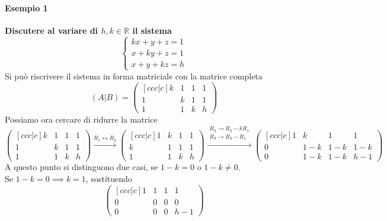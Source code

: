 \paragraph{Esempio 1}%
\textbf{Discutere al variare di $h,k\in\mathbb{R}$ il sistema}
\begin{equation*}
  \begin{cases}
    kx + y + z = 1\\
    x + ky + z = 1\\
    x + y + kz = h
  \end{cases}
\end{equation*}
Si può riscrivere il sistema in forma matriciale con la matrice completa
\begin{equation*}
  (A\vert B) =
  \begin{pmatrix}[ccc|c]
    k & 1 & 1 & 1\\
    1 & k & 1 & 1\\
    1 & 1 & k & h
  \end{pmatrix}
\end{equation*}
Possiamo ora cercare di ridurre la matrice
\begin{equation*}
  \begin{pmatrix}[ccc|c]
    k & 1 & 1 & 1\\
    1 & k & 1 & 1\\
    1 & 1 & k & h
  \end{pmatrix}
  \xrightarrow{R_1\leftrightarrow R_2}
  \begin{pmatrix}[ccc|c]
    1 & k & 1 & 1\\
    k & 1 & 1 & 1\\
    1 & 1 & k & h
  \end{pmatrix}
  \xrightarrow{\substack{R_2\to R_2-kR_1\\ R_3\to R_3-R_1}}
  \begin{pmatrix}[ccc|c]
    1 & k & 1 & 1\\
    0 & 1-k & 1-k & 1-k\\
    0 & 1-k & 1-k & h-1
  \end{pmatrix}
\end{equation*}
A questo punto si distinguono due casi, se $1-k = 0$ o $1-k\neq0$.\\
Se $1-k=0\implies k=1$, sostituendo
\begin{equation*}
  \begin{pmatrix}[ccc|c]
    1 & 1 & 1 & 1\\
    0 & 0 & 0 & 0\\
    0 & 0 & 0 & h-1
  \end{pmatrix}
\end{equation*}
